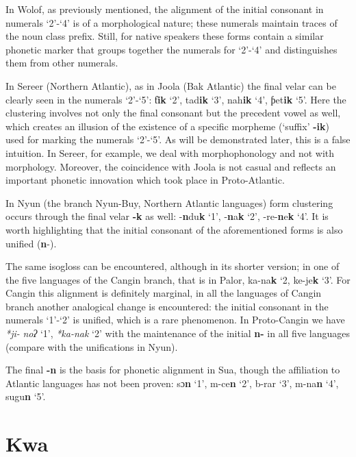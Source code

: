 In Wolof, as previously mentioned, the alignment of the initial consonant in numerals ‘2’-‘4’ is of a morphological nature; these numerals maintain traces of the noun class prefix. Still, for native speakers these forms contain a similar phonetic marker that groups together the numerals for ‘2’-‘4’ and distinguishes them from other numerals. 

In Sereer (Northern Atlantic), as in Joola (Bak Atlantic) the final velar can be clearly seen in the numerals ‘2’-‘5’: ƭ\textbf{ik} ‘2’, tad\textbf{ik} ‘3’, nah\textbf{ik} ‘4’, ƥet\textbf{ik} ‘5’. Here the clustering involves not only the final consonant but the precedent vowel as well, which creates an illusion of the existence of a specific morpheme (‘suffix’ \textbf{-ik}) used for marking the numerals ‘2’-‘5’. As will be demonstrated later, this is a false intuition. In Sereer, for example, we deal with morphophonology and not with morphology. Moreover, the coincidence with Joola is not casual and reflects an important phonetic innovation which took place in Proto-Atlantic.  

In Nyun (the branch Nyun-Buy, Northern Atlantic languages) form clustering occurs through the final velar \textbf{-k} as well: -\textbf{n}du\textbf{k} ‘1’, -\textbf{n}a\textbf{k} ‘2’, -re-\textbf{n}e\textbf{k} ‘4’.  It is worth highlighting that the initial consonant of the aforementioned forms is also unified (\textbf{n}-).

The same isogloss can be encountered, although in its shorter version; in one of the five languages of the Cangin branch, that is in Palor, ka-na\textbf{k} ‘2, ke-je\textbf{k} ‘3’. For Cangin this alignment is definitely marginal, in all the languages of Cangin branch another analogical change is encountered: the initial consonant in the numerals ‘1’-‘2’ is unified, which is a rare phenomenon. In Proto-Cangin we have  \textit{*ji-} \textit{noʔ} ‘1’, \textit{*ka-nak} ‘2’ with the maintenance of the initial \textbf{n-} in all five languages (compare with the unifications in Nyun). 

The final \textbf{-n} is the basis for phonetic alignment in Sua, though the affiliation to Atlantic languages has not been proven: sɔ\textbf{n} ‘1’, m-ce\textbf{n} ‘2’, b-rar ‘3’, m-na\textbf{n} ‘4’, sugu\textbf{n} ‘5’.

 
\section{Kwa%
}

